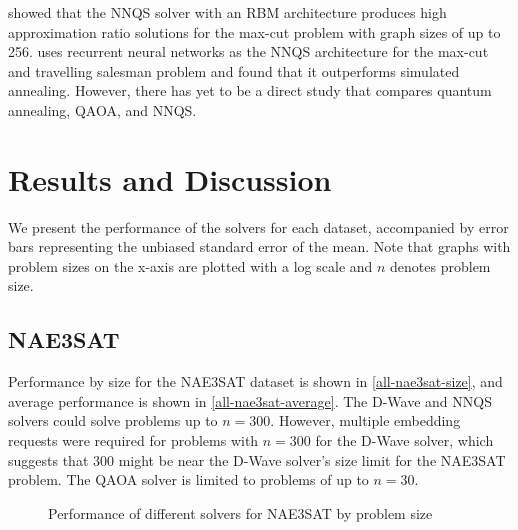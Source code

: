  showed that the NNQS solver with an RBM architecture produces high approximation ratio solutions for the max-cut problem with graph sizes of up to 256.  uses recurrent neural networks as the NNQS architecture for the max-cut and travelling salesman problem and found that it outperforms simulated annealing. However, there has yet to be a direct study that compares quantum annealing, QAOA, and NNQS.

\section{Results and Discussion}
We present the performance of the solvers for each dataset, accompanied by error bars representing the unbiased standard error of the mean. Note that graphs with problem sizes on the x-axis are plotted with a log scale and $n$ denotes problem size.

\subsection{NAE3SAT}
Performance by size for the NAE3SAT dataset is shown in \autoref{all-nae3sat-size}, and average performance is shown in \autoref{all-nae3sat-average}. The D-Wave and NNQS solvers could solve problems up to $n=300$. However, multiple embedding requests were required for problems with $n=300$ for the D-Wave solver, which suggests that $300$ might be near the D-Wave solver's size limit for the NAE3SAT problem. The QAOA solver is limited to problems of up to $n=30$.

\begin{figure}[!htb]
    \centering
    \caption{Performance of different solvers for NAE3SAT by problem size}
    \label{all-nae3sat-size}
\end{figure}

